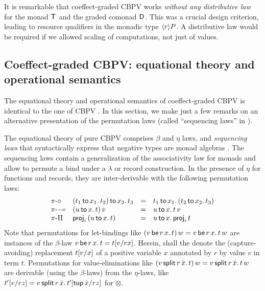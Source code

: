 \documentclass[acmsmall,review,anonymous]{acmart}\settopmatter{printfolios=true,printccs=false,printacmref=false}
\theoremstyle{remark}
\begin{document}
It is remarkable that coeffect-graded CBPV works \emph{without any
  distributive law} \cite{orchard:icfp16}
for the monad $\T$ and the graded comonad $\D$.
%
This was a crucial design criterion, leading to resource qualifiers in
the monadic type $\compty r P$.
%
A distributive law would be required if we allowed scaling of
computations, not just of values.


\subsection{Coeffect-graded CBPV: equational theory and operational semantics}

The equational theory and operational semantics of coeffect-graded
CBPV is identical to the one of CBPV \citep[Fig.~11]{levy:hosc06}.  In
this section, we make just a few remarks on an alternative
presentation of the permutation laws (called ``sequencing laws'' in
\loccit).

The equational theory of pure CBPV comprises $\beta$ and $\eta$ laws,
and \emph{sequencing laws} that syntactically express that negative
types are monad algebras \citep[Fig.~11]{levy:hosc06}.  The sequencing
laws contain a generalization of the associativity law for monads and
allow to permute a bind under a $\lambda$ or record construction.  In
the presence of $\eta$ for functions and records, they are
inter-derivable with the following permutation laws:
\[
\begin{array}{llcl}
\rpi\diamond
  & \bind {x_2} {(\bind {x_1} {t_1} {t_2})} {t_3}
  & = & \bind {x_1} {t_1} {(\bind {x_2} {t_2} {t_3})}
\\
\rpi\lolli
  & \app {(\bind x u t)} v
  & = & \bind x u {\app t v}
\\
\rpi\Pi
  & \proj i {(\bind x  u t)}
  & = & \bind x u {\proj i t}
\end{array}
\]
Note that permutations for let-bindings like
$\app{(\qlet r x v t)}w = \qlet r x v {\app t w}$ are instances of the
$\beta$-law $\qlet r x v t = \qsubst v r x t$.
%
Herein,  shall the denote the
(capture-avoiding) replacement $\subst v x t$ of a positive variable
$x$ annotated by $r$ by value $v$ in term $t$.
%
Permutations for value-eliminations like
$\app {(\qsplits r v {\bar x} t)} w = \qsplits r v {\bar x} {\app t
  w}$
are derivable (using the $\beta$-laws) from the $\eta$-laws, like
$\qsubst{v}{r}{z}{t'} = \qsplits r {v} {\bar x} {\qsubst {\ptup {\bar
      x}} r z {t'}}$ for $\otimes$.
\end{document}
